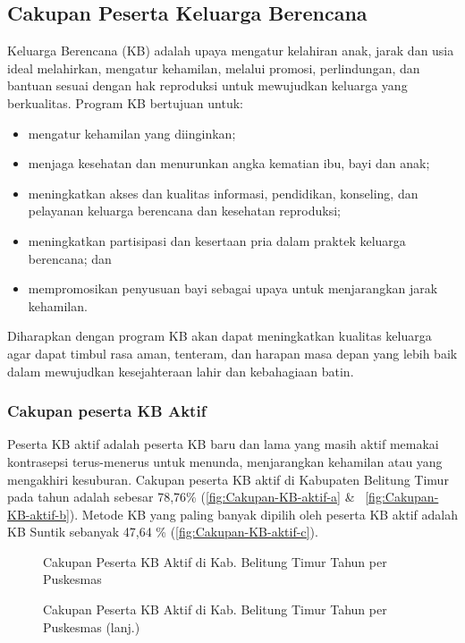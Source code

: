 \subsection{Cakupan Peserta Keluarga Berencana}
Keluarga Berencana (KB) adalah upaya mengatur kelahiran anak, jarak dan usia ideal melahirkan, mengatur kehamilan, melalui promosi, perlindungan, dan bantuan sesuai dengan hak reproduksi untuk mewujudkan keluarga yang berkualitas. Program KB bertujuan untuk:
\begin{itemize}
 \item mengatur kehamilan yang diinginkan;
 \item menjaga kesehatan dan menurunkan angka kematian ibu, bayi dan anak;
 \item meningkatkan akses dan kualitas informasi, pendidikan, konseling, dan pelayanan keluarga berencana dan kesehatan reproduksi;
 \item meningkatkan partisipasi dan kesertaan pria dalam praktek keluarga berencana; dan
 \item mempromosikan penyusuan bayi sebagai upaya untuk menjarangkan jarak kehamilan.
\end{itemize}
Diharapkan dengan program KB akan dapat meningkatkan kualitas keluarga agar dapat timbul rasa aman, tenteram, dan harapan masa depan yang lebih baik dalam mewujudkan kesejahteraan lahir dan kebahagiaan batin.

\subsubsection{Cakupan peserta KB Aktif}
Peserta KB aktif adalah peserta KB baru dan lama yang masih aktif memakai kontrasepsi terus-menerus untuk menunda, menjarangkan kehamilan atau yang mengakhiri kesuburan. Cakupan peserta KB aktif di Kabupaten Belitung Timur pada tahun \tP adalah sebesar 78,76\% (\autoref{fig:Cakupan-KB-aktif-a} \& ~\autoref{fig:Cakupan-KB-aktif-b}). Metode KB yang paling banyak dipilih oleh peserta KB aktif adalah KB Suntik sebanyak 47,64 \% (\autoref{fig:Cakupan-KB-aktif-c}).

\begin{figure}[H]
    \centering
    \caption{Cakupan Peserta KB Aktif di Kab. Belitung Timur Tahun \tP per Puskesmas}
    \label{fig:Cakupan-KB-aktif-a}
\end{figure}

\begin{figure}[H]
    \centering
    \caption{Cakupan Peserta KB Aktif di Kab. Belitung Timur Tahun \tP per Puskesmas (lanj.)}
    \label{fig:Cakupan-KB-aktif-b}
\end{figure}

